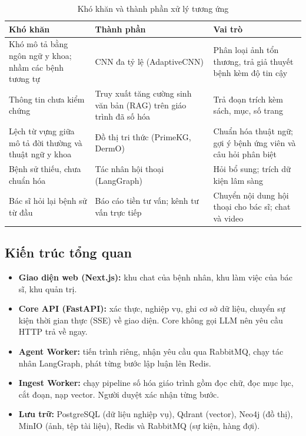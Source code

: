 \begin{table}[H]
\centering
\small
\begin{tabular}{|p{4.2cm}|p{4.3cm}|p{5.2cm}|}
\hline
\textbf{Khó khăn} & \textbf{Thành phần} & \textbf{Vai trò} \\ \hline
Khó mô tả bằng ngôn ngữ y khoa; nhầm các bệnh tương tự & CNN đa tỷ lệ (AdaptiveCNN) & Phân loại ảnh tổn thương, trả giả thuyết bệnh kèm độ tin cậy \\ \hline
Thông tin chưa kiểm chứng & Truy xuất tăng cường sinh văn bản (RAG) trên giáo trình đã số hóa & Trả đoạn trích kèm sách, mục, số trang \\ \hline
Lệch từ vựng giữa mô tả đời thường và thuật ngữ y khoa & Đồ thị tri thức (PrimeKG, DermO) & Chuẩn hóa thuật ngữ; gợi ý bệnh ứng viên và câu hỏi phân biệt \\ \hline
Bệnh sử thiếu, chưa chuẩn hóa & Tác nhân hội thoại (LangGraph) & Hỏi bổ sung; trích dữ kiện lâm sàng \\ \hline
Bác sĩ hỏi lại bệnh sử từ đầu & Báo cáo tiền tư vấn; kênh tư vấn trực tiếp & Chuyển nội dung hội thoại cho bác sĩ; chat và video \\ \hline
\end{tabular}
\caption{Khó khăn và thành phần xử lý tương ứng}
\label{tab:giai-phap}
\end{table}

\subsection{Kiến trúc tổng quan}

\begin{itemize}
  \item \textbf{Giao diện web (Next.js):} khu chat của bệnh nhân, khu làm việc của bác sĩ, khu quản trị.
  \item \textbf{Core API (FastAPI):} xác thực, nghiệp vụ, ghi cơ sở dữ liệu, chuyển sự kiện thời gian thực (SSE) về giao diện. Core không gọi LLM nên yêu cầu HTTP trả về ngay.
  \item \textbf{Agent Worker:} tiến trình riêng, nhận yêu cầu qua RabbitMQ, chạy tác nhân LangGraph, phát từng bước lập luận lên Redis.
  \item \textbf{Ingest Worker:} chạy pipeline số hóa giáo trình gồm đọc chữ, đọc mục lục, cắt đoạn, nạp vector. Người duyệt xác nhận từng bước.
  \item \textbf{Lưu trữ:} PostgreSQL (dữ liệu nghiệp vụ), Qdrant (vector), Neo4j (đồ thị), MinIO (ảnh, tệp tài liệu), Redis và RabbitMQ (sự kiện, hàng đợi).
\end{itemize}

